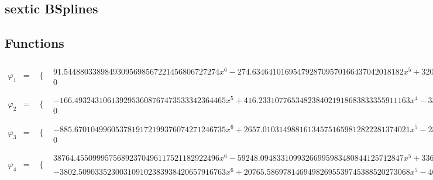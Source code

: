 \documentclass{article}
\begin{document}
 

\begin{landscape}
\section{sextic BSplines}
\subsection{Functions}\begin{eqnarray*} \varphi_1 & = & \begin{array}{cc}
 \{ & 
\begin{array}{cc}
 91.54488033898493095698567221456806727274 x^6-274.6346410169547928709570166437042018182 x^5+320.4070811864472583494498527509882354546 x^4-183.0897606779698619139713444291361345455 x^3+45.77244016949246547849283610728403363637 x^2 & x\geq 0\land x<1 \\
 0 & \text{True}
\end{array}

\end{array}\\
\varphi_2 & = & \begin{array}{cc}
 \{ & 
\begin{array}{cc}
 -166.4932431061392953608767473533342364465 x^5+416.2331077653482384021918683833355911163 x^4-332.9864862122785907217534947066684728930 x^3+83.24662155306964768043837367666711822325 x^2 & x\geq 0\land x<1 \\
 0 & \text{True}
\end{array}

\end{array}\\
\varphi_3 & = & \begin{array}{cc}
 \{ & 
\begin{array}{cc}
 -885.6701049960537819172199376074271246735 x^6+2657.010314988161345751659812822281374021 x^5-2855.718351365481104515138644977793869941 x^4+1283.086177750693299444177601918452116514 x^3-198.7080363773197587634788321555124959203 x^2 & x\geq 0\land x<1 \\
 0 & \text{True}
\end{array}

\end{array}\\
\varphi_4 & = & \begin{array}{cc}
 \{ & 
\begin{array}{cc}
 38764.45509995756892370496117521182922496 x^6-59248.09483310993266995983480844125712847 x^5+33679.00741002346761775787255220369070116 x^4-8393.340079305285660767519172781372390886 x^3+761.9975491090004465558888089263127665824 x^2 & x\geq 0\land x<\frac{1}{2} \\
 -3802.509033523003109102383938420657916763 x^6+20765.58697814694982695539745388520273068 x^5-46527.58188362280979526416528171180936058 x^4+54649.79319666166073587879845563577516304 x^3-35411.90519305723433818995451036242896472 x^2+11971.87764102399516963749114176270372982 x-1645.261705629558489915183320788785381476 & x\geq \frac{1}{2}\land x<1
\end{array}


\end{array}
\end{eqnarray*}
\end{landscape}
\end{document}
